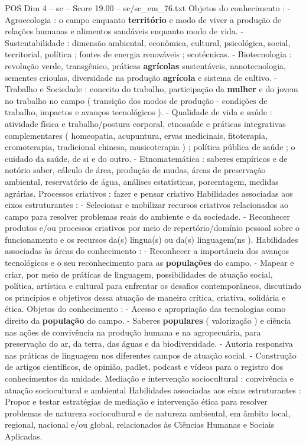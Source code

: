 \begin{textsample}{POS Dim 4 – sc – Score 19.00 – sc/sc\_em\_76.txt}
Objetos do conhecimento : - Agroecologia : o campo enquanto \textbf{território} e modo de viver a produção de relações humanas e alimentos saudáveis enquanto modo de vida. - Sustentabilidade : dimensão ambiental, econômica, cultural, psicológica, social, territorial, política ; fontes de energia renováveis ; ecotécnicas. - Biotecnologia : revolução verde, transgênico, práticas \textbf{agrícolas} sustentáveis, nanotecnologia, sementes crioulas, diversidade na produção \textbf{agrícola} e sistema de cultivo. - Trabalho e Sociedade : conceito do trabalho, participação da \textbf{mulher} e do jovem no trabalho no campo ( transição dos modos de produção - condições de trabalho, impactos e avanços tecnológicos ). - Qualidade de vida e saúde : atividade física e trabalho/postura corporal, etnosaúde e práticas integrativas complementares ( homeopatia, acupuntura, ervas medicinais, fitoterapia, cromoterapia, tradicional chinesa, musicoterapia ) ; política pública de saúde ; o cuidado da saúde, de si e do outro. - Etnomatemática : saberes empíricos e de notório saber, cálculo de área, produção de mudas, áreas de preservação ambiental, reservatório de água, análises estatísticas, porcentagem, medidas agrárias.
Processos criativos : fazer e pensar criativo Habilidades associadas aos eixos estruturantes : - Selecionar e mobilizar recursos criativos relacionados ao campo para resolver problemas reais do ambiente e da sociedade. - Reconhecer produtos e/ou processos criativos por meio de repertório/domínio pessoal sobre o funcionamento e os recursos da(s) língua(s) ou da(s) linguagem(ns ).
Habilidades associadas às áreas do conhecimento : - Reconhecer a importância dos avanços tecnológicos e o seu reconhecimento para as \textbf{populações} do campo. - Mapear e criar, por meio de práticas de linguagem, possibilidades de atuação social, política, artística e cultural para enfrentar os desafios contemporâneos, discutindo os princípios e objetivos dessa atuação de maneira crítica, criativa, solidária e ética.
Objetos do conhecimento : - Acesso e apropriação das tecnologias como direito da \textbf{população} do campo. - Saberes \textbf{populares} ( valorização ) e ciência nas ações de convivência na produção humana e na agropecuária, para preservação do ar, da terra, das águas e da biodiversidade. - Autoria responsiva nas práticas de linguagem nos diferentes campos de atuação social. - Construção de artigos científicos, de opinião, padlet, podcast e vídeos para o registro dos conhecimentos da unidade.
Mediação e intervenção sociocultural : convivência e atuação sociocultural e ambiental Habilidades associadas aos eixos estruturantes : Propor e testar estratégias de mediação e intervenção ética para resolver problemas de natureza sociocultural e de natureza ambiental, em âmbito local, regional, nacional e/ou global, relacionados às Ciências Humanas e Sociais Aplicadas.

\end{textsample}
